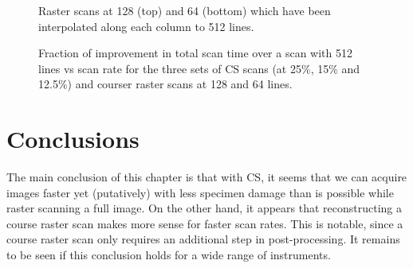 \documentclass[twocolumn,oneside]{IEEEtran/IEEEtran}
\begin{document}
\begin{figure}
  \centering
  
  \caption{Raster scans at 128 (top) and 64 (bottom) which have been
    interpolated along each column to 512 lines.}
  \label{fig:results_subline_images}
\end{figure}

\begin{figure}
  
  \caption{Fraction of improvement in total scan time over a scan with
    512 lines vs scan rate for the three sets of CS scans (at 25\%,
    15\% and 12.5\%) and courser raster scans at 128 and 64 lines.}
  \label{fig:improve_512}
\end{figure}






%   

\section{Conclusions}\label{sec:conclusions}
The main conclusion of this chapter is that with CS, it seems that we
can acquire images faster yet (putatively) with less specimen damage
than is possible while raster scanning a full image. On the other hand, it appears that reconstructing a course raster scan makes more sense for faster scan rates. This is notable, since a course raster scan only requires an additional step in post-processing. It remains to be seen if this conclusion holds for a wide range of instruments.







\end{document}
